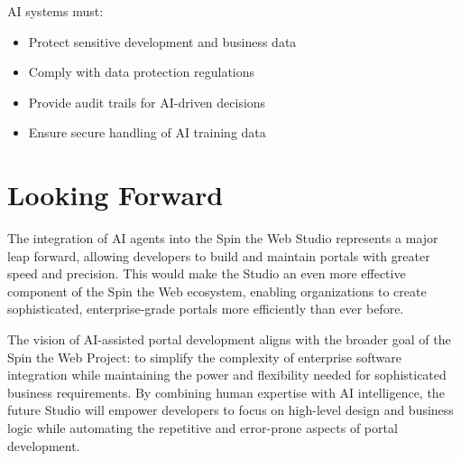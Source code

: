 AI systems must:
\begin{itemize}
\item Protect sensitive development and business data
\item Comply with data protection regulations
\item Provide audit trails for AI-driven decisions
\item Ensure secure handling of AI training data
\end{itemize}

\section{Looking Forward}
\label{sec:ai-future}

The integration of AI agents into the Spin the Web Studio represents a major leap forward, allowing developers to build and maintain portals with greater speed and precision. This would make the Studio an even more effective component of the Spin the Web ecosystem, enabling organizations to create sophisticated, enterprise-grade portals more efficiently than ever before.

The vision of AI-assisted portal development aligns with the broader goal of the Spin the Web Project: to simplify the complexity of enterprise software integration while maintaining the power and flexibility needed for sophisticated business requirements. By combining human expertise with AI intelligence, the future Studio will empower developers to focus on high-level design and business logic while automating the repetitive and error-prone aspects of portal development.
